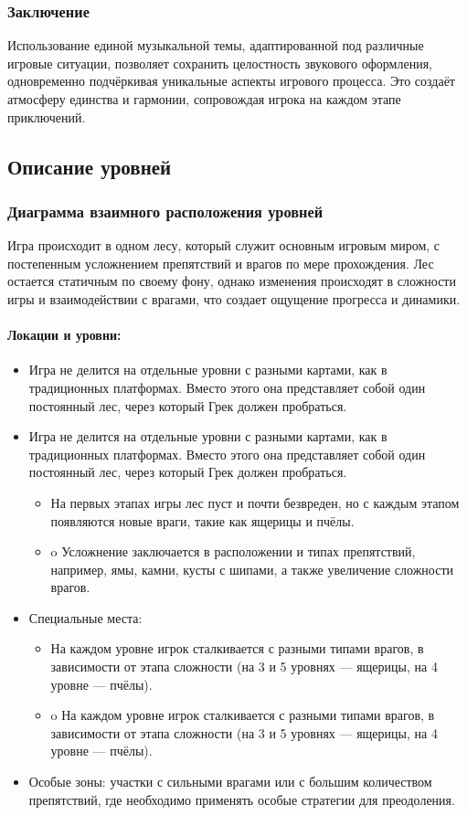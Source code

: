 \documentclass{article}
\begin{document}
\subsubsection{Заключение}
Использование единой музыкальной темы, адаптированной под различные игровые ситуации, позволяет сохранить целостность звукового оформления, одновременно подчёркивая уникальные аспекты игрового процесса. Это создаёт атмосферу единства и гармонии, сопровождая игрока на каждом этапе приключений.

\subsection{Описание уровней}

\subsubsection{Диаграмма взаимного расположения уровней}
Игра происходит в одном лесу, который служит основным игровым миром, с постепенным усложнением препятствий и врагов по мере прохождения. Лес остается статичным по своему фону, однако изменения происходят в сложности игры и взаимодействии с врагами, что создает ощущение прогресса и динамики.

\paragraph{Локации и уровни:}  
\begin{itemize}
    \item Игра не делится на отдельные уровни с разными картами, как в традиционных платформах. Вместо этого она представляет собой один постоянный лес, через который Грек должен пробраться.
    \item Игра не делится на отдельные уровни с разными картами, как в традиционных платформах. Вместо этого она представляет собой один постоянный лес, через который Грек должен пробраться.
    \begin{itemize}
        \item На первых этапах игры лес пуст и почти безвреден, но с каждым этапом появляются новые враги, такие как ящерицы и пчёлы.
        \item o	Усложнение заключается в расположении и типах препятствий, например, ямы, камни, кусты с шипами, а также увеличение сложности врагов.
    \end{itemize}
    \item Специальные места:
    \begin{itemize}
        \item На каждом уровне игрок сталкивается с разными типами врагов, в зависимости от этапа сложности (на 3 и 5 уровнях — ящерицы, на 4 уровне — пчёлы).
        \item o	На каждом уровне игрок сталкивается с разными типами врагов, в зависимости от этапа сложности (на 3 и 5 уровнях — ящерицы, на 4 уровне — пчёлы).
    \end{itemize}
    \item Особые зоны: участки с сильными врагами или с большим количеством препятствий, где необходимо применять особые стратегии для преодоления.
\end{itemize}
\end{document}
